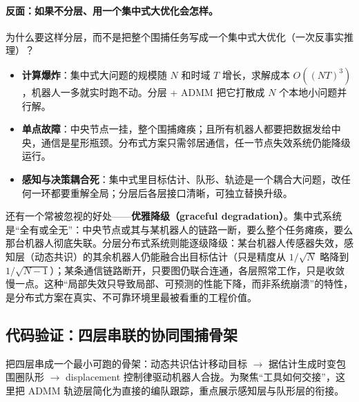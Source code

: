 \paragraph{反面：如果不分层、用一个集中式大优化会怎样。}
为什么要这样分层，而不是把整个围捕任务写成一个集中式大优化（一次反事实推理）？
\begin{itemize}
  \item \textbf{计算爆炸}：集中式大问题的规模随 $N$ 和时域 $T$ 增长，求解成本 $O((NT)^3)$，机器人一多就实时跑不动。分层 + ADMM 把它打散成 $N$ 个本地小问题并行解。
  \item \textbf{单点故障}：中央节点一挂，整个围捕瘫痪；且所有机器人都要把数据发给中央，通信是星形瓶颈。分布式方案只需邻居通信，任一节点失效系统仍能降级运行。
  \item \textbf{感知与决策耦合死}：集中式里目标估计、队形、轨迹是一个耦合大问题，改任何一环都要重解全局；分层后各层接口清晰，可独立替换升级。
\end{itemize}
还有一个常被忽视的好处——\textbf{优雅降级（graceful degradation）}。集中式系统是“全有或全无”：中央节点或其与某机器人的链路一断，要么整个任务瘫痪，要么那台机器人彻底失联。分层分布式系统则能逐级降级：某台机器人传感器失效，感知层（动态共识）的其余机器人仍能融合出目标估计（只是精度从 $1/\sqrt N$ 略降到 $1/\sqrt{N-1}$）；某条通信链路断开，只要图仍联合连通，各层照常工作，只是收敛慢一点。这种“局部失效只导致局部、可预测的性能下降，而非系统崩溃”的特性，是分布式方案在真实、不可靠环境里最被看重的工程价值。

\subsection{代码验证：四层串联的协同围捕骨架}
\label{sec:cs-pursuit-code}

把四层串成一个最小可跑的骨架：动态共识估计移动目标 $\to$ 据估计生成时变包围圈队形 $\to$ displacement 控制律驱动机器人合拢。为聚焦“工具如何交接”，这里把 ADMM 轨迹层简化为直接的编队跟踪，重点展示感知层与队形层的衔接。

